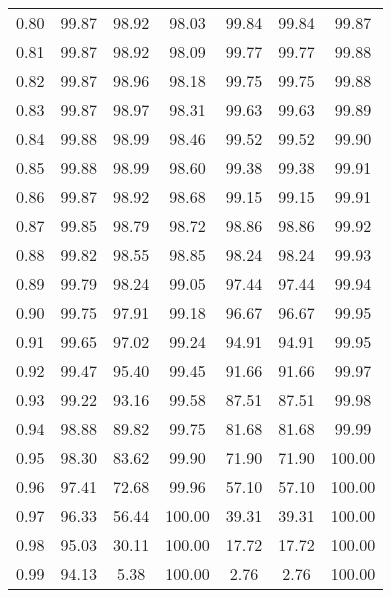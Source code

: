 \begin{tabular}{|c|c|c|c|c|c|c|}
      0.80 &     99.87 &     98.92 &      98.03 &   99.84 &      99.84 &         99.87 \\
      0.81 &     99.87 &     98.92 &      98.09 &   99.77 &      99.77 &         99.88 \\
      0.82 &     99.87 &     98.96 &      98.18 &   99.75 &      99.75 &         99.88 \\
      0.83 &     99.87 &     98.97 &      98.31 &   99.63 &      99.63 &         99.89 \\
      0.84 &     99.88 &     98.99 &      98.46 &   99.52 &      99.52 &         99.90 \\
      0.85 &     99.88 &     98.99 &      98.60 &   99.38 &      99.38 &         99.91 \\
      0.86 &     99.87 &     98.92 &      98.68 &   99.15 &      99.15 &         99.91 \\
      0.87 &     99.85 &     98.79 &      98.72 &   98.86 &      98.86 &         99.92 \\
      0.88 &     99.82 &     98.55 &      98.85 &   98.24 &      98.24 &         99.93 \\
      0.89 &     99.79 &     98.24 &      99.05 &   97.44 &      97.44 &         99.94 \\
      0.90 &     99.75 &     97.91 &      99.18 &   96.67 &      96.67 &         99.95 \\
      0.91 &     99.65 &     97.02 &      99.24 &   94.91 &      94.91 &         99.95 \\
      0.92 &     99.47 &     95.40 &      99.45 &   91.66 &      91.66 &         99.97 \\
      0.93 &     99.22 &     93.16 &      99.58 &   87.51 &      87.51 &         99.98 \\
      0.94 &     98.88 &     89.82 &      99.75 &   81.68 &      81.68 &         99.99 \\
      0.95 &     98.30 &     83.62 &      99.90 &   71.90 &      71.90 &        100.00 \\
      0.96 &     97.41 &     72.68 &      99.96 &   57.10 &      57.10 &        100.00 \\
      0.97 &     96.33 &     56.44 &     100.00 &   39.31 &      39.31 &        100.00 \\
      0.98 &     95.03 &     30.11 &     100.00 &   17.72 &      17.72 &        100.00 \\
      0.99 &     94.13 &      5.38 &     100.00 &    2.76 &       2.76 &        100.00 \\
\bottomrule
\end{tabular}
